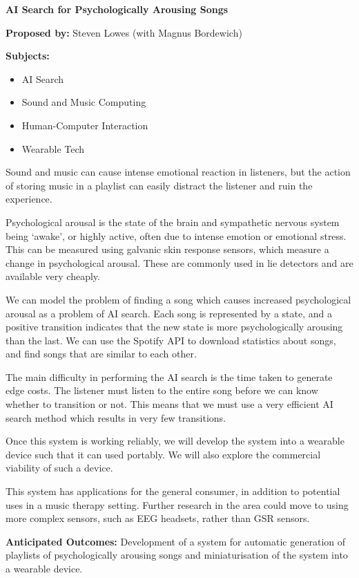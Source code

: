 \documentclass[a4paper,12pt]{article}
\begin{document}
	\begin{center}
		\Huge \textbf{AI Search for Psychologically Arousing Songs}
	\end{center}

	\textbf{Proposed by:} Steven Lowes (with Magnus Bordewich)
	
	\textbf{Subjects:}
	\begin{itemize}
		\item AI Search
		\item Sound and Music Computing
		\item Human-Computer Interaction
		\item Wearable Tech
	\end{itemize}

	Sound and music can cause intense emotional reaction in listeners, but the action of storing music in a playlist can easily distract the listener and ruin the experience.
	
	Psychological arousal is the state of the brain and sympathetic nervous system being `awake', or highly active, often due to intense emotion or emotional stress. This can be measured using galvanic skin response sensors, which measure a change in psychological arousal. These are commonly used in lie detectors and are available very cheaply.
	
	We can model the problem of finding a song which causes increased psychological arousal as a problem of AI search. Each song is represented by a state, and a positive transition indicates that the new state is more psychologically arousing than the last. We can use the Spotify API to download statistics about songs, and find songs that are similar to each other.
	
	The main difficulty in performing the AI search is the time taken to generate edge costs. The listener must listen to the entire song before we can know whether to transition or not. This means that we must use a very efficient AI search method which results in very few transitions.
	
	Once this system is working reliably, we will develop the system into a wearable device such that it can used portably. We will also explore the commercial viability of such a device.
	
	This system has applications for the general consumer, in addition to potential uses in a music therapy setting. Further research in the area could move to using more complex sensors, such as EEG headsets, rather than GSR sensors.
	
	\textbf{Anticipated Outcomes:} Development of a system for automatic generation of playlists of psychologically arousing songs and miniaturisation of the system into a wearable device. \cite{test}
	
	
\end{document}
